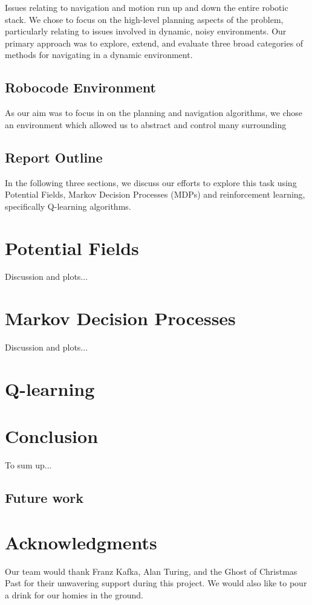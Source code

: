 \documentclass{aiaa-tc}%
\begin{document}
Issues relating to navigation and motion run up and down the entire
robotic stack. We chose to focus on the high-level planning aspects of
the problem, particularly relating to issues involved in dynamic,
noisy environments. Our primary approach was to explore, extend, and
evaluate three broad categories of methods for navigating in a dynamic
environment.

\subsection{Robocode Environment}

As our aim was to focus in on the planning and navigation algorithms,
we chose an environment which allowed us to abstract and control many
surrounding


\subsection{Report Outline}
In the following three sections, we discuss our efforts to explore
this task using Potential Fields, Markov Decision Processes (MDPs) and
reinforcement learning, specifically Q-learning algorithms.

\section{Potential Fields}
\label{Potential Fields}
Discussion and plots...

\section{Markov Decision Processes}
\label{Markov Decision Processes}
Discussion and plots...

\section{Q-learning}
\label{Q-learning}


\section{Conclusion}
\label{Conclusion}
To sum up...

\subsection{Future work}

\section{Acknowledgments}
Our team would thank Franz Kafka, Alan Turing, and the Ghost of
Christmas Past for their unwavering support during this project. We
would also like to pour a drink for our homies in the ground.


% 

% 
\end{document}
